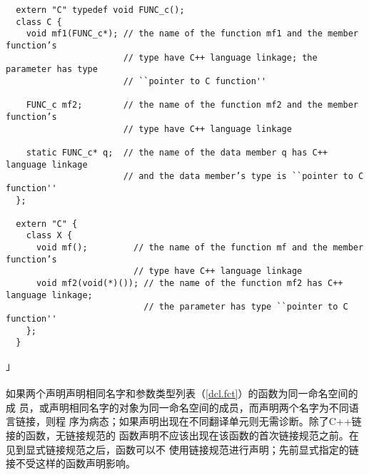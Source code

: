 \begin{lstlisting}
  extern "C" typedef void FUNC_c();
  class C {
    void mf1(FUNC_c*); // the name of the function mf1 and the member function’s
                       // type have C++ language linkage; the parameter has type
                       // ``pointer to C function''

    FUNC_c mf2;        // the name of the function mf2 and the member function’s
                       // type have C++ language linkage

    static FUNC_c* q;  // the name of the data member q has C++ language linkage
                       // and the data member’s type is ``pointer to C function''
  };

  extern "C" {
    class X {
      void mf();         // the name of the function mf and the member function’s
                         // type have C++ language linkage
      void mf2(void(*)()); // the name of the function mf2 has C++ language linkage;
                           // the parameter has type ``pointer to C function''
    };
  }
\end{lstlisting}」

\paragraph{}
如果两个声明声明相同名字和参数类型列表（\ref{dcl.fct}）的函数为同一命名空间的成
员，或声明相同名字的对象为同一命名空间的成员，而声明两个名字为不同语言链接，则程
序为病态；如果声明出现在不同翻译单元则无需诊断。除了C++链接的函数，无链接规范的
函数声明不应该出现在该函数的首次链接规范之前。在见到显式链接规范之后，函数可以不
使用链接规范进行声明；先前显式指定的链接不受这样的函数声明影响。

